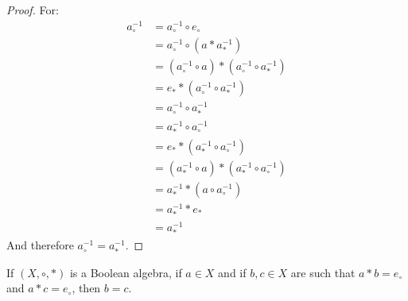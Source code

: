     \begin{proof}
        For:
        \begin{align}
            a_{\circ}^{\minus{1}}
            &=a_{\circ}^{\minus{1}}\circ{e}_{\circ}
            \tag{Identity}\\
            &=a_{\circ}^{\minus{1}}\circ(a*a_{*}^{\minus{1}})
            \tag{Complement Property}\\
            &=(a_{\circ}^{\minus{1}}\circ{a})*
              (a_{\circ}^{\minus{1}}\circ{a}_{*}^{\minus{1}})
            \tag{Distributivity}\\
            &=e_{*}*(a_{\circ}^{\minus{1}}\circ{a}_{*}^{\minus{1}})
            \tag{Complement Property}\\
            &=a_{\circ}^{\minus{1}}\circ{a}_{*}^{\minus{1}}
            \tag{Identity}\\
            &=a_{*}^{\minus{1}}\circ{a}_{\circ}^{\minus{1}}
            \tag{Commutativity}\\
            &=e_{*}*(a_{*}^{\minus{1}}\circ{a}_{\circ}^{\minus{1}})
            \tag{Identity}\\
            &=(a_{*}^{\minus{1}}\circ{a})*
              (a_{*}^{\minus{1}}\circ{a}_{\circ}^{\minus{1}})
            \tag{Complement Property}\\
            &=a_{*}^{\minus{1}}*(a\circ{a}_{\circ}^{\minus{1}})
            \tag{Distributivity}\\
            &=a_{*}^{\minus{1}}*e_{*}
            \tag{Complement Property}\\
            &=a_{*}^{\minus{1}}
            \tag{Identity}
        \end{align}
        And therefore $a_{\circ}^{\minus{1}}=a_{*}^{\minus{1}}$.
    \end{proof}
    \begin{theorem}
        \label{thm:Bool_Uniquness_of_Comp}
        If $(X,\circ,*)$ is a Boolean algebra, if $a\in{X}$ and if
        $b,c\in{X}$ are such that $a*b=e_{\circ}$ and $a*c=e_{\circ}$, then
        $b=c$.
    \end{theorem}
